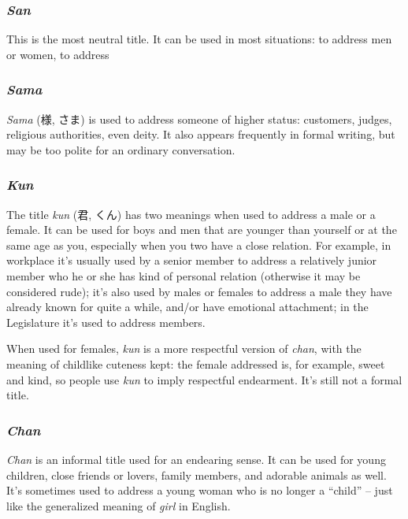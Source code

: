 \documentclass[UTF8, a4paper, oneside, scheme=plain]{ctexrep}
\newcommand{\corpus}[1]{\emph{#1}}
\begin{document}
\subsubsection{\corpus{San}}

This is the most neutral title.
It can be used in most situations:
to address men or women, to address 

\subsubsection{\corpus{Sama}}

\corpus{Sama} (様, さま) is used to address someone of higher status:
customers, judges, religious authorities, even deity.
It also appears frequently in formal writing, 
but may be too polite for an ordinary conversation.

\subsubsection{\corpus{Kun}}

The title \corpus{kun} (君, くん) has two meanings when used to address a male or a female.
It can be used for boys and men that are younger than yourself or at the same age as you,
especially when you two have a close relation.
For example, 
in workplace it's usually used by a senior member to address a relatively junior member 
who he or she has kind of personal relation (otherwise it may be considered rude);
it's also used by males or females to address a male they have already known for quite a while,
and/or have emotional attachment;
in the Legislature it's used to address members.

When used for females, \corpus{kun} is a more respectful version of \corpus{chan},
with the meaning of childlike cuteness kept:
the female addressed is, for example, sweet and kind,
so people use \corpus{kun} to imply respectful endearment.
It's still not a formal title.

\subsubsection{\corpus{Chan}}

\corpus{Chan} is an informal title used for an endearing sense.
It can be used for young children, close friends or lovers, family members, and adorable animals as well.
It's sometimes used to address a young woman who is no longer a ``child'' 
-- just like the generalized meaning of \corpus{girl} in English.
\end{document}
